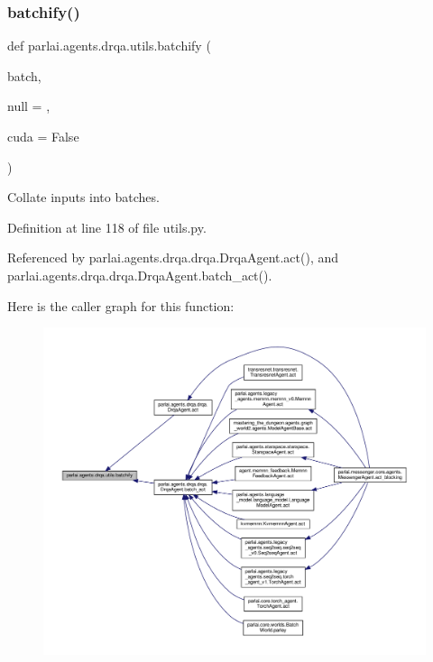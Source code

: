 \subsubsection{\texorpdfstring{batchify()}{batchify()}}
{\footnotesize\ttfamily def parlai.\+agents.\+drqa.\+utils.\+batchify (\begin{DoxyParamCaption}\item[{}]{batch,  }\item[{}]{null = {},  }\item[{}]{cuda = {\ttfamily False} }\end{DoxyParamCaption})}

\begin{DoxyVerb}Collate inputs into batches.\end{DoxyVerb}
 

Definition at line 118 of file utils.\+py.



Referenced by parlai.\+agents.\+drqa.\+drqa.\+Drqa\+Agent.\+act(), and parlai.\+agents.\+drqa.\+drqa.\+Drqa\+Agent.\+batch\+\_\+act().

Here is the caller graph for this function\+:
\nopagebreak
\begin{figure}[H]
\begin{center}
\leavevmode
\includegraphics[width=350pt]{namespaceparlai_1_1agents_1_1drqa_1_1utils_aca22dd97c5b6dcda2a7479c1cb22ef1e_icgraph}
\end{center}
\end{figure}
\mbox{\label{namespaceparlai_1_1agents_1_1drqa_1_1utils_a14201349d4a16b48aa7929cfdbf10ebd}} 

